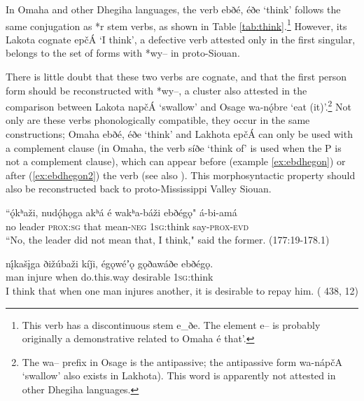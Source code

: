 \documentclass[oneside,a4paper,11pt]{article}
\newcommand{\ipa}[1]{{\phon#1}} %
\begin{document}
 In Omaha and other Dhegiha languages, the verb \ipa{ebðé}, \ipa{éðe} `think' follows the same conjugation as *\ipa{r} stem verbs, as shown in Table \ref{tab:think}.\footnote{This verb has a discontinuous stem  \ipa{e\_ðe}. The element \ipa{e--} is probably originally a demonstrative related to Omaha \ipa{é}  that'.} However, its Lakota cognate  \ipa{epčÁ} `I think', a defective verb attested only in the first singular, belongs to the set of forms with *\ipa{wy--} in proto-Siouan.  
 
 There is little doubt that these two verbs are cognate, and that the first person form  should be reconstructed with  *\ipa{wy--}, a cluster also attested in the comparison between Lakota \ipa{napčÁ}  `swallow'	and Osage \ipa{wa-nǫ́bre} `eat (it)'.\footnote{The \ipa{wa--} prefix in Osage is the antipassive; the antipassive form \ipa{wa-nápčA} `swallow' also exists in Lakhota). This word is apparently not attested in other Dhegiha languages.} Not only are these verbs phonologically compatible, they occur in the same constructions;  Omaha  \ipa{ebðé}, \ipa{éðe} `think' and Lakhota \ipa{epčÁ}  can only be used with a complement clause (in Omaha, the verb \ipa{síðe} `think of' is used when the P is not a complement clause), which can appear before (example \ref{ex:ebdhegon}) or after (\ref{ex:ebdhegon2})  the verb (see also \citealt{ullrich08}). This morphosyntactic property should also be reconstructed back to proto-Mississippi Valley Siouan.

\begin{exe}
 \ex \label{ex:ebdhegon} 
 \gll ``\ipa{ǫ́kʰaži,}  	\ipa{nudǫ́hǫga}  	\ipa{akʰá}  	\ipa{é}  	\ipa{wakʰa-báži}  	\ipa{ebðégǫ}"  	\ipa{á-bi-amá}\\
no leader \textsc{prox:sg} that mean-\textsc{neg} \textsc{1sg}:think say-\textsc{prox-evd}\\
\glt ``No, the leader did not mean that, I think," said the former. (177:19-178.1)
\end{exe}



\begin{exe}
 \ex \label{ex:ebdhegon2}
 \gll 
\ipa{nį́kašįga}  	\ipa{ðižúbaži}  	\ipa{kíǰi,}  	\ipa{égǫwéʼǫ}  	\ipa{gǫðawáðe}  	\ipa{ebðégǫ.}  \\
man injure when do.this.way desirable \textsc{1sg}:think \\
\glt I think that when one man injures another, it is desirable to repay him. ( 438,  12)
  \end{exe}
\end{document}
